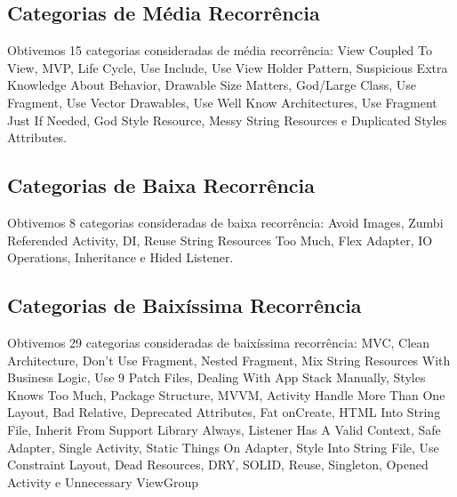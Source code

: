 \subsection{Categorias de M\'edia Recorr\^encia}
Obtivemos 15 categorias consideradas de m\'edia recorr\^encia: View Coupled To View, MVP, Life Cycle, Use Include, Use View Holder Pattern, Suspicious Extra Knowledge About Behavior, Drawable Size Matters, God/Large Class, Use Fragment, Use Vector Drawables, Use Well Know Architectures, Use Fragment Just If Needed, God Style Resource, Messy String Resources e Duplicated Styles Attributes.


\subsection{Categorias de Baixa Recorr\^encia}
Obtivemos 8 categorias consideradas de baixa recorr\^encia: Avoid Images, Zumbi Referended Activity, DI, Reuse String Resources Too Much, Flex Adapter, IO Operations, Inheritance e Hided Listener.


\subsection{Categorias de Baix\'issima Recorr\^encia}
Obtivemos 29 categorias consideradas de baix\'issima recorr\^encia: MVC, Clean Architecture, Don't Use Fragment, Nested Fragment, Mix String Resources With Business Logic, Use 9 Patch Files, Dealing With App Stack Manually, Styles Knows Too Much, Package Structure, MVVM, Activity Handle More Than One Layout, Bad Relative, Deprecated Attributes, Fat onCreate, HTML Into String File, Inherit From Support Library Always, Listener Has A Valid Context, Safe Adapter, Single Activity, Static Things On Adapter, Style Into String File, Use Constraint Layout, Dead Resources, DRY, SOLID, Reuse, Singleton, Opened Activity e Unnecessary ViewGroup








